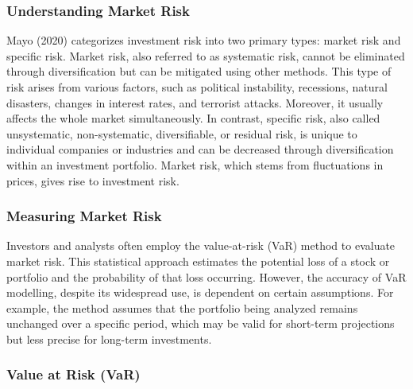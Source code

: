 \subsubsection{Understanding Market Risk}

Mayo (2020) categorizes investment risk into two primary types: market risk and specific risk. Market risk, 
also referred to as systematic risk, cannot be eliminated through diversification but can be mitigated using 
other methods. This type of risk arises from various factors, such as political instability, recessions, natural 
disasters, changes in interest rates, and terrorist attacks. Moreover, it usually affects the whole market 
simultaneously. In contrast, specific risk, also called unsystematic, non-systematic, diversifiable, or residual 
risk, is unique to individual companies or industries and can be decreased through diversification within an 
investment portfolio. Market risk, which stems from fluctuations in prices, gives rise to investment risk.

\subsubsection{Measuring Market Risk}

Investors and analysts often employ the value-at-risk (VaR) method to evaluate market risk. This statistical 
approach estimates the potential loss of a stock or portfolio and the probability of that loss occurring. 
However, the accuracy of VaR modelling, despite its widespread use, is dependent on certain assumptions. 
For example, the method assumes that the portfolio being analyzed remains unchanged over a specific period, 
which may be valid for short-term projections but less precise for long-term investments.

\subsubsection{Value at Risk (VaR)}

